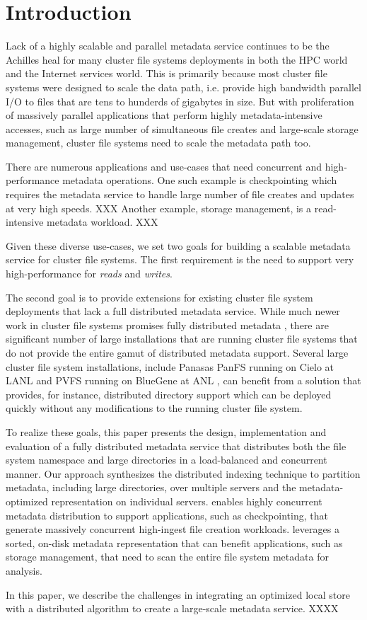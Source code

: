 \section{Introduction}

Lack of a highly scalable and parallel metadata service continues to be the 
Achilles heal for many cluster file systems deployments in both the HPC world 
and the Internet services world.
This is primarily because most cluster file systems were designed to scale the
data path, i.e. provide high bandwidth parallel I/O to files that are tens to
hunderds of gigabytes in size.
But with proliferation of massively parallel applications that perform highly
metadata-intensive accesses, such as large number of simultaneous file creates
and large-scale storage management, cluster file systems need to scale the
metadata path too.

There are numerous applications and use-cases that need concurrent and 
high-performance metadata operations.
One such example is checkpointing which requires the metadata service to
handle large number of file creates and updates at very high speeds. XXX 
Another example, storage management, is a read-intensive metadata workload. XXX

Given these diverse use-cases, we set two goals for building a scalable
metadata service for cluster file systems. The first requirement
is the need to support very high-performance for \textit{reads} and
\textit{writes}.

The second goal is to provide extensions for existing cluster file system
deployments that lack a full distributed metadata service.
While much newer work in cluster file systems promises fully distributed
metadata \cite{ceph:weil06}, there are significant number of large
installations that are running cluster file systems that do not provide the
entire gamut of distributed metadata support.
Several large cluster file system installations, include Panasas PanFS running
on Cielo at LANL \cite{panfs-cielo} and PVFS running on BlueGene at ANL
\cite{pvfs-anl}, can benefit from a solution that provides, for instance,
distributed directory support which can be deployed quickly without any
modifications to the running cluster file system.

To realize these goals, this paper presents the design, implementation and
evaluation of a fully distributed metadata service that distributes both the
file system namespace and large directories in a load-balanced and concurrent
manner.
Our approach synthesizes the \giga{} distributed indexing technique to partition
metadata, including large directories, over multiple servers and the \tfs{}
metadata-optimized representation on individual servers.
\giga{} enables highly concurrent metadata distribution to support applications, 
such as checkpointing, that generate massively concurrent high-ingest file 
creation workloads.
\tfs{} leverages a sorted, on-disk metadata representation that can benefit
applications, such as storage management, that need to scan the entire file
system metadata for analysis. 

In this paper, we describe the challenges in integrating an optimized local
store with a distributed algorithm to create a large-scale metadata service.
XXXX

